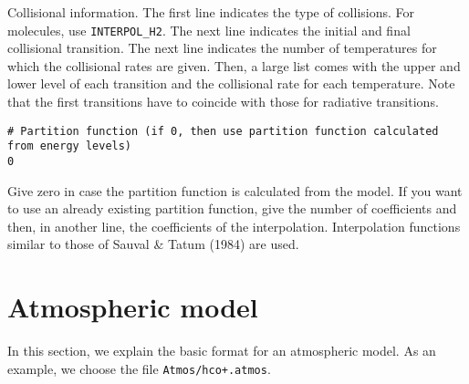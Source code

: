 \documentclass[12pt]{article}
\begin{document}
Collisional information. The first line indicates the type of
collisions. For molecules, use \texttt{INTERPOL\_H2}. The next
line indicates the initial and final collisional transition.
The next line indicates the number of temperatures for which
the collisional rates are given. Then, a large list comes with the
upper and lower level of each transition and the collisional
rate for each temperature. Note that the first transitions have
to coincide with those for radiative transitions.
 
\begin{footnotesize} \begin{verbatim}
# Partition function (if 0, then use partition function calculated from energy levels)
0
\end{verbatim} \end{footnotesize}
Give zero in case the partition function is calculated from the model. If you
want to use an already existing partition function, give the number of
coefficients and then, in another line, the coefficients of the interpolation.
Interpolation functions similar to those of Sauval \& Tatum (1984) are used.

\section{Atmospheric model}
In this section, we explain the basic format for an atmospheric model.
As an example, we choose the file \texttt{Atmos/hco+.atmos}.
\end{document}
